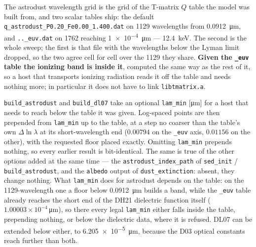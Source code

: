\documentclass{my_memo}
\begin{document}
The astrodust wavelength grid is the grid of the T-matrix $Q$ table the
model was built from, and two scalar tables ship: the default
\texttt{q\_astrodust\_P0.20\_Fe0.00\_1.400.dat} on 1129 wavelengths from
\SI{0.0912}{\micro\meter}, and \texttt{..\_euv.dat} on 1762 reaching
\SI{1e-4}{\micro\meter} --- \SI{12.4}{\kilo\electronvolt}. The second is
the whole sweep; the first is that file with the wavelengths below the
Lyman limit dropped, so the two agree cell for cell over the 1129 they
share. \textbf{Given the \texttt{\_euv} table the ionizing band is inside
it}, computed the same way as the rest of it, so a host that transports
ionizing radiation reads it off the table and needs nothing more; in
particular it does not have to link \texttt{libtmatrix.a}.

\medskip
\noindent \texttt{build\_astrodust} and \texttt{build\_dl07} take an
optional \texttt{lam\_min} [\si{\micro\meter}] for a host that needs to
reach below the table it was given. Log-spaced points are then prepended from
\texttt{lam\_min} up to the table, at a step no coarser than the
table's own $\Delta\ln\lambda$ at its short-wavelength end ($0.00794$ on
the \texttt{\_euv} axis, $0.01156$ on the other),
with the requested floor placed exactly. Omitting \texttt{lam\_min}
prepends nothing, so every earlier result is bit-identical. The same is
true of the other options added at the same time --- the
\texttt{astrodust\_index\_path} of \texttt{sed\_init} /
\texttt{build\_astrodust}, and the \texttt{albedo} output of
\texttt{dust\_extinction}: absent, they change nothing. What
\texttt{lam\_min} does for astrodust depends on the table: on the
1129-wavelength one a floor below \SI{0.0912}{\micro\meter} builds a
band, while the \texttt{\_euv} table already reaches
the short end of the DH21 dielectric function itself
($1.00003\times10^{-4}$\,\si{\micro\meter}), so there every legal
\texttt{lam\_min} either falls inside the table, prepending nothing, or
below the dielectric data, where it is refused. DL07 can be
extended below either, to \SI{6.205e-5}{\micro\meter}, because the D03 optical
constants reach further than both.
\end{document}
